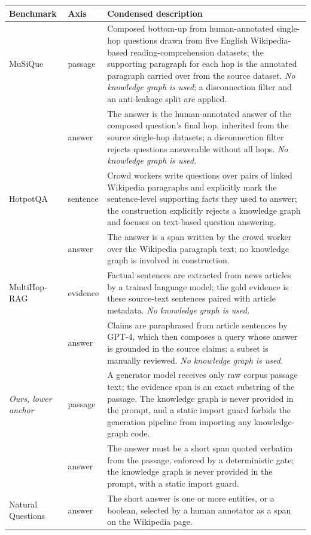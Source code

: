 \documentclass[11pt]{article}
\begin{document}
\begin{table}[tp]\centering\footnotesize
\setlength{\tabcolsep}{3pt}\emergencystretch=2pt
\begin{tabular}{@{}p{}p{}p{}@{}}
\toprule
\raggedright Benchmark & Axis & Condensed description\tabularnewline
\midrule
\raggedright MuSiQue & passage & Composed bottom-up from human-annotated single-hop questions drawn from five English Wikipedia-based reading-comprehension datasets; the supporting paragraph for each hop is the annotated paragraph carried over from the source dataset. \emph{No knowledge graph is used}; a disconnection filter and an anti-leakage split are applied.\tabularnewline
 & answer & The answer is the human-annotated answer of the composed question's final hop, inherited from the source single-hop datasets; a disconnection filter rejects questions answerable without all hops. \emph{No knowledge graph is used.}\tabularnewline
\addlinespace[1.5pt]
\raggedright HotpotQA & sentence & Crowd workers write questions over pairs of linked Wikipedia paragraphs and explicitly mark the sentence-level supporting facts they used to answer; the construction explicitly rejects a knowledge graph and focuses on text-based question answering.\tabularnewline
 & answer & The answer is a span written by the crowd worker over the Wikipedia paragraph text; no knowledge graph is involved in construction.\tabularnewline
\addlinespace[1.5pt]
\raggedright MultiHop-RAG & evidence & Factual sentences are extracted from news articles by a trained language model; the gold evidence is these source-text sentences paired with article metadata. \emph{No knowledge graph is used.}\tabularnewline
 & answer & Claims are paraphrased from article sentences by GPT-4, which then composes a query whose answer is grounded in the source claims; a subset is manually reviewed. \emph{No knowledge graph is used.}\tabularnewline
\addlinespace[1.5pt]
\raggedright \textit{Ours, lower anchor} & passage & A generator model receives only raw corpus passage text; the evidence span is an exact substring of the passage. The knowledge graph is never provided in the prompt, and a static import guard forbids the generation pipeline from importing any knowledge-graph code.\tabularnewline
 & answer & The answer must be a short span quoted verbatim from the passage, enforced by a deterministic gate; the knowledge graph is never provided in the prompt, with a static import guard.\tabularnewline
\addlinespace[1.5pt]
\raggedright Natural Questions & answer & The short answer is one or more entities, or a boolean, selected by a human annotator as a span on the Wikipedia page.\tabularnewline

\end{tabular}
\end{table}
\end{document}

